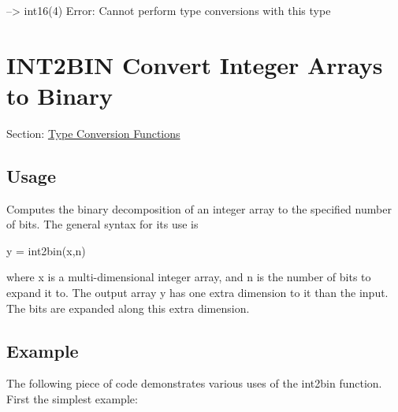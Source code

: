 \begin{DoxyVerbInclude}
--> int16({4})
Error: Cannot perform type conversions with this type
\end{DoxyVerbInclude}
 \hypertarget{typecast_int2bin}{}\section{I\-N\-T2\-B\-I\-N Convert Integer Arrays to Binary}\label{typecast_int2bin}
Section\-: \hyperlink{sec_typecast}{Type Conversion Functions} \hypertarget{vtkwidgets_vtkxyplotwidget_Usage}{}\subsection{Usage}\label{vtkwidgets_vtkxyplotwidget_Usage}
Computes the binary decomposition of an integer array to the specified number of bits. The general syntax for its use is \begin{DoxyVerb}   y = int2bin(x,n)
\end{DoxyVerb}
 where {\ttfamily x} is a multi-\/dimensional integer array, and {\ttfamily n} is the number of bits to expand it to. The output array {\ttfamily y} has one extra dimension to it than the input. The bits are expanded along this extra dimension. \hypertarget{variables_struct_Example}{}\subsection{Example}\label{variables_struct_Example}
The following piece of code demonstrates various uses of the int2bin function. First the simplest example\-:


